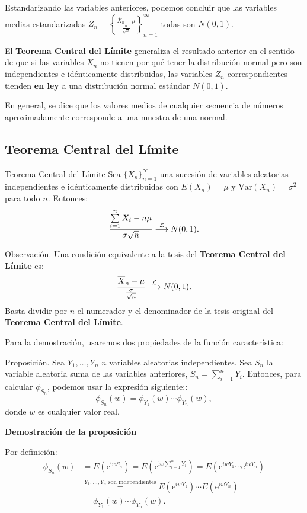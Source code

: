 \documentclass[]{book}
\begin{document}
Estandarizando las variables anteriores, podemos concluir que las variables medias estandarizadas \(Z_n =\left\{\frac{\overline{X}_n-\mu}{\frac{\sigma}{\sqrt{n}}}\right\}_{n=1}^\infty\) todas son \(N(0,1)\).

El \textbf{Teorema Central del Límite} generaliza el resultado anterior en el sentido de que si las variables \(X_n\) no tienen por qué tener la distribución normal pero son independientes e idénticamente distribuidas, las variables \(Z_n\) correspondientes tienden \textbf{en ley} a una distribución normal estándar \(N(0,1)\).

En general, se dice que los valores medios de cualquier secuencia de números aproximadamente corresponde a una muestra de una normal.

\hypertarget{teorema-central-del-luxedmite-1}{%
\subsection{Teorema Central del Límite}\label{teorema-central-del-luxedmite-1}}

 Teorema Central del Límite
Sea \(\{X_n\}_{n=1}^\infty\) una sucesión de variables aleatorias independientes e idénticamente distribuidas con \(E(X_n)=\mu\) y \(\mathrm{Var}(X_n)=\sigma^2\) para todo \(n\). Entonces:
\[
\frac{\sum\limits_{i=1}^n X_i-n\mu}{\sigma\sqrt{n}}\stackrel{{\cal L}}{\longrightarrow} N(0,1).
\]

 Observación.
Una condición equivalente a la tesis del \textbf{Teorema Central del Límite} es:
\[
\frac{\overline{X}_n-\mu}{\frac{\sigma}{\sqrt{n}}}\stackrel{{\cal L}}{\longrightarrow} N(0,1).
\]
Basta dividir por \(n\) el numerador y el denominador de la tesis original del \textbf{Teorema Central del Límite}.

Para la demostración, usaremos dos propiedades de la función característica:

 Proposición.
Sea \(Y_1,\ldots, Y_n\) \(n\) variables aleatorias independientes. Sea \(S_n\) la variable aleatoria suma de las variables anteriores, \(S_n=\sum\limits_{i=1}^n Y_i\). Entonces, para calcular \(\phi_{S_n}\), podemos usar la expresión siguiente::
\[
\phi_{S_n}(w)=\phi_{Y_1}(w)\cdots \phi_{Y_n}(w),
\]
donde \(w\) es cualquier valor real.

\textbf{Demostración de la proposición}

Por definición:
\[
\begin{array}{rl}
\phi_{S_n}(w) & =E\left(\mathrm{e}^{\mathrm{i} w S_n}\right)=E\left(\mathrm{e}^{\mathrm{i} w \sum\limits_{i=1}^n Y_i}\right) = E\left(\mathrm{e}^{i w Y_1}\cdots \mathrm{e}^{i w Y_n}\right)\\ & \stackrel{\mbox{$Y_1,\ldots,Y_n$ son independientes}}{=} E\left(\mathrm{e}^{i w Y_1}\right)\cdots E\left(\mathrm{e}^{i w Y_n}\right) \\
& =\phi_{Y_1}(w)\cdots \phi_{Y_n}(w).
\end{array}
\]
\end{document}
